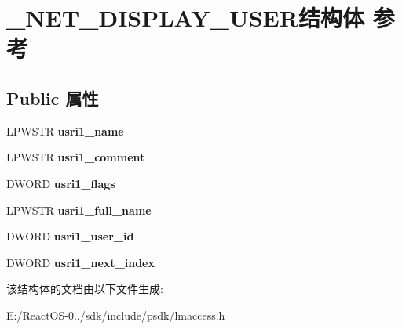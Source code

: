 \hypertarget{struct___n_e_t___d_i_s_p_l_a_y___u_s_e_r}{}\section{\+\_\+\+N\+E\+T\+\_\+\+D\+I\+S\+P\+L\+A\+Y\+\_\+\+U\+S\+E\+R结构体 参考}
\label{struct___n_e_t___d_i_s_p_l_a_y___u_s_e_r}
\subsection*{Public 属性}
\begin{DoxyCompactItemize}
\item 
\mbox{\label{struct___n_e_t___d_i_s_p_l_a_y___u_s_e_r_adcef65311bd27c4396f7847011ce6736}} 
L\+P\+W\+S\+TR {\bfseries usri1\+\_\+name}
\item 
\mbox{\label{struct___n_e_t___d_i_s_p_l_a_y___u_s_e_r_a0f4078d677d344190e2c930e1ed3000f}} 
L\+P\+W\+S\+TR {\bfseries usri1\+\_\+comment}
\item 
\mbox{\label{struct___n_e_t___d_i_s_p_l_a_y___u_s_e_r_abbf96818bbd88854e0f385ef87bc10d8}} 
D\+W\+O\+RD {\bfseries usri1\+\_\+flags}
\item 
\mbox{\label{struct___n_e_t___d_i_s_p_l_a_y___u_s_e_r_af85bf6ccdbdd22b30a2ead9c18ae3289}} 
L\+P\+W\+S\+TR {\bfseries usri1\+\_\+full\+\_\+name}
\item 
\mbox{\label{struct___n_e_t___d_i_s_p_l_a_y___u_s_e_r_a5e57fa1fc2091294695fcc3ab780cf0b}} 
D\+W\+O\+RD {\bfseries usri1\+\_\+user\+\_\+id}
\item 
\mbox{\label{struct___n_e_t___d_i_s_p_l_a_y___u_s_e_r_a83111cea69b0088da533b6bb5d965a82}} 
D\+W\+O\+RD {\bfseries usri1\+\_\+next\+\_\+index}
\end{DoxyCompactItemize}


该结构体的文档由以下文件生成\+:\begin{DoxyCompactItemize}
\item 
E\+:/\+React\+O\+S-\/0../sdk/include/psdk/lmaccess.\+h\end{DoxyCompactItemize}
